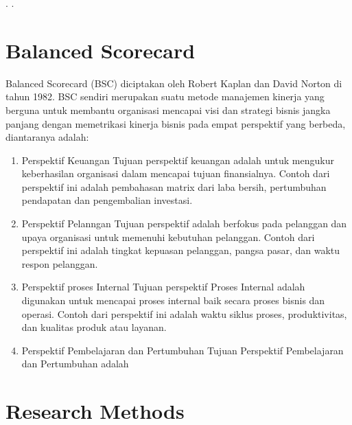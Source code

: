 \documentclass[conference]{IEEEtran}
\begin{document}
.
.

\section{Balanced Scorecard}
Balanced Scorecard (BSC) diciptakan oleh Robert Kaplan dan David Norton di tahun 1982. BSC sendiri merupakan suatu metode manajemen kinerja yang berguna untuk membantu organisasi mencapai visi dan strategi bisnis jangka panjang dengan memetrikasi kinerja bisnis pada empat perspektif yang berbeda, diantaranya adalah:
\begin{enumerate}
\item Perspektif Keuangan 
Tujuan perspektif keuangan adalah untuk mengukur keberhasilan organisasi dalam mencapai tujuan finansialnya. Contoh dari perspektif ini adalah pembahasan matrix dari laba bersih, pertumbuhan pendapatan dan pengembalian investasi.
\item Perspektif Pelanngan 
Tujuan perspektif adalah berfokus pada pelanggan dan upaya organisasi untuk memenuhi kebutuhan pelanggan. Contoh dari perspektif ini adalah tingkat kepuasan pelanggan, pangsa pasar, dan waktu respon pelanggan.
\item Perspektif proses Internal
Tujuan perspektif Proses Internal adalah digunakan untuk mencapai proses internal baik secara proses bisnis dan operasi. Contoh dari perspektif ini adalah waktu siklus proses, produktivitas, dan kualitas produk atau layanan.
\item Perspektif Pembelajaran dan Pertumbuhan
Tujuan Perspektif Pembelajaran dan Pertumbuhan adalah 
\end{enumerate}

\section{Research Methods}
\end{document}
